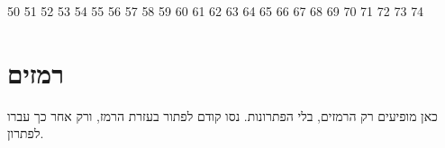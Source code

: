 \documentclass[12pt, a4paper]{article}
\begin{document}
\expandafter\def\csname qref@func-018\endcsname{50}
\expandafter\def\csname qref@func-024\endcsname{51}
\expandafter\def\csname qref@lim-001\endcsname{52}
\expandafter\def\csname qref@lim-002\endcsname{53}
\expandafter\def\csname qref@lim-033\endcsname{54}
\expandafter\def\csname qref@lim-003\endcsname{55}
\expandafter\def\csname qref@lim-035\endcsname{56}
\expandafter\def\csname qref@lim-004\endcsname{57}
\expandafter\def\csname qref@lim-036\endcsname{58}
\expandafter\def\csname qref@lim-037\endcsname{59}
\expandafter\def\csname qref@lim-038\endcsname{60}
\expandafter\def\csname qref@lim-039\endcsname{61}
\expandafter\def\csname qref@lim-040\endcsname{62}
\expandafter\def\csname qref@lim-005\endcsname{63}
\expandafter\def\csname qref@lim-006\endcsname{64}
\expandafter\def\csname qref@lim-007\endcsname{65}
\expandafter\def\csname qref@lim-027\endcsname{66}
\expandafter\def\csname qref@lim-000\endcsname{67}
\expandafter\def\csname qref@lim-008\endcsname{68}
\expandafter\def\csname qref@lim-009\endcsname{69}
\expandafter\def\csname qref@lim-023\endcsname{70}
\expandafter\def\csname qref@lim-010\endcsname{71}
\expandafter\def\csname qref@lim-011\endcsname{72}
\expandafter\def\csname qref@lim-042\endcsname{73}
\expandafter\def\csname qref@lim-043\endcsname{74}
\renewcommand{\qref}[1]{\ifcsname qref@#1\endcsname\csname qref@#1\endcsname\else\textenglish{#1}\fi}

\newpage
\section*{רמזים}
כאן מופיעים רק הרמזים, בלי הפתרונות. נסו קודם לפתור בעזרת הרמז, ורק אחר כך עברו לפתרון.
\end{document}
